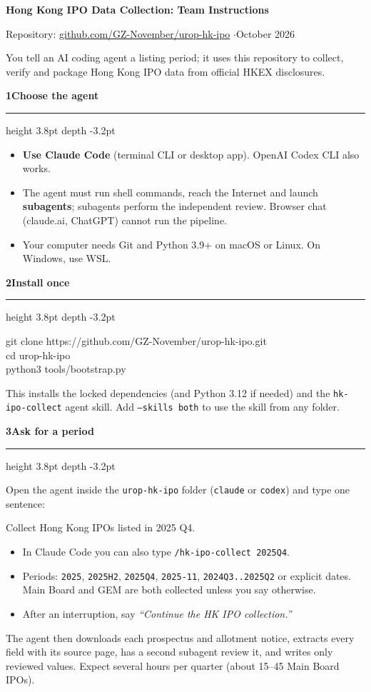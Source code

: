 \documentclass[11pt,a4paper]{article}
\newcommand{\step}[2]{\par\vspace{6pt}%
  {\color{accent}\large\bfseries #1\enspace #2}\enspace
  {\color{accent!30}\leaders\hrule height 3.8pt depth -3.2pt\hfill\kern0pt}\par\vspace{2pt}}
\newcommand{\cmd}[1]{\colorbox{soft}{\texttt{#1}}}
\begin{document}
{\color{accent}\LARGE\bfseries Hong Kong IPO Data Collection: Team Instructions}\par\vspace{3pt}
{\small\color{note}Repository:
\href{https://github.com/GZ-November/urop-hk-ipo}{github.com/GZ-November/urop-hk-ipo}
\quad$\cdot$\quad October 2026}\par\vspace{6pt}

You tell an AI coding agent a listing period; it uses this repository to collect,
verify and package Hong Kong IPO data from official HKEX disclosures.

\step{1}{Choose the agent}
\begin{itemize}
\item \textbf{Use Claude Code} (terminal CLI or desktop app). OpenAI Codex CLI also works.
\item The agent must run shell commands, reach the Internet and launch \textbf{subagents};
      subagents perform the independent review. Browser chat (claude.ai, ChatGPT) cannot run the pipeline.
\item Your computer needs Git and Python 3.9+ on macOS or Linux. On Windows, use WSL.
\end{itemize}

\step{2}{Install once}
\begin{codebox}
git clone https://github.com/GZ-November/urop-hk-ipo.git\\
cd urop-hk-ipo\\
python3 tools/bootstrap.py
\end{codebox}
This installs the locked dependencies (and Python 3.12 if needed) and the
\texttt{hk-ipo-collect} agent skill. Add \cmd{--skills both} to use the skill from any folder.

\step{3}{Ask for a period}
Open the agent inside the \texttt{urop-hk-ipo} folder (\cmd{claude} or \cmd{codex}) and type one sentence:
\begin{saybox}
Collect Hong Kong IPOs listed in 2025 Q4.
\end{saybox}
\begin{itemize}
\item In Claude Code you can also type \cmd{/hk-ipo-collect 2025Q4}.
\item Periods: \texttt{2025}, \texttt{2025H2}, \texttt{2025Q4}, \texttt{2025-11},
      \texttt{2024Q3..2025Q2} or explicit dates. Main Board and GEM are both collected unless you say otherwise.
\item After an interruption, say \emph{``Continue the HK IPO collection.''}
\end{itemize}
The agent then downloads each prospectus and allotment notice, extracts every field
with its source page, has a second subagent review it, and writes only reviewed values.
Expect several hours per quarter (about 15--45 Main Board IPOs).
\end{document}
